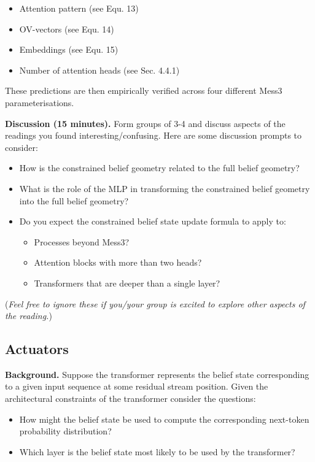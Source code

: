 \documentclass[11pt]{article}
\begin{document}
\begin{itemize}
\item
  Attention pattern (see Equ. 13)
\item
  OV-vectors (see Equ. 14)
\item
  Embeddings (see Equ. 15)
\item
  Number of attention heads (see Sec. 4.4.1)
\end{itemize}

These predictions are then empirically verified across four different Mess3 parameterisations.

\textbf{Discussion (15 minutes).} Form groups of 3-4 and discuss aspects of the readings you found interesting/confusing. Here are some discussion prompts to consider:

\begin{itemize}
\item
  How is the constrained belief geometry related to the full belief geometry?
\item
  What is the role of the MLP in transforming the constrained belief geometry into the full belief geometry?
\item
  Do you expect the constrained belief state update formula to apply to:
  \begin{itemize}
  \item
    Processes beyond Mess3?
  \item
    Attention blocks with more than two heads?
  \item
    Transformers that are deeper than a single layer?
  \end{itemize}
\end{itemize}

(\emph{Feel free to ignore these if you/your group is excited to explore other aspects of the reading.})

\subsection{Actuators}\label{actuators}

\textbf{Background.} Suppose the transformer represents the belief state corresponding to a given input sequence at some residual stream position. Given the architectural constraints of the transformer consider the questions:

\begin{itemize}
\item
  How might the belief state be used to compute the corresponding next-token probability distribution?
\item
  Which layer is the belief state most likely to be used by the transformer?
\end{itemize}
\end{document}
